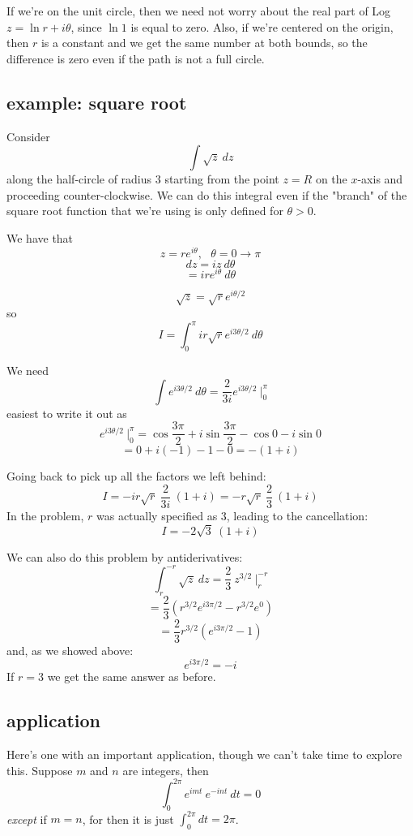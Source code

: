 \documentclass[11pt, oneside]{article}
\begin{document}
If we're on the unit circle, then we need not worry about the real part of Log $z = \ln r + i \theta$, since $\ln 1$ is equal to zero.  Also, if we're centered on the origin, then $r$ is a constant and we get the same number at both bounds, so the difference is zero even if the path is not a full circle.

\subsection*{example: square root}
Consider
\[ \int \sqrt{z} \ dz \]
along the half-circle of radius $3$ starting from the point $z = R$ on the $x$-axis and proceeding counter-clockwise.
We can do this integral even if the "branch" of the square root function that we're using is only defined for $\theta > 0$.  

We have that 
\[ z = re^{i\theta}, \ \ \ \theta = 0 \rightarrow \pi \]
\[ dz = iz \ d \theta \]
\[ = ire^{i\theta} \ d \theta \]

\[ \sqrt{z} = \sqrt{r} e^{i\theta/2} \]
so
\[ I = \int_0^{\pi} ir \sqrt{r} e^{i3\theta/2} \ d \theta \]

We need
\[ \int e^{i3\theta/2} \ d \theta = \frac{2}{3i} e^{i3\theta/2} \ \bigg |_0^{\pi} \]
easiest to write it out as
\[ e^{i3\theta/2} \ \bigg |_0^{\pi} = \cos \frac{3\pi}{2} + i \sin  \frac{3\pi}{2} - \cos 0 - i \sin 0 \]
\[ = 0 + i(-1) - 1 - 0 = -(1+i) \]

Going back to pick up all the factors we left behind:
\[ I = -ir \sqrt{r} \ \frac{2}{3i} \ (1+i) = -r \sqrt{r} \ \frac{2}{3} \ (1+i) \]
In the problem, $r$ was actually specified as $3$, leading to the cancellation:
\[ I = - 2 \sqrt{3} \ (1+i) \]

We can also do this problem by antiderivatives:
\[ \int_r^{-r} \sqrt{z} \ dz = \frac{2}{3} \ z^{3/2} \ \bigg |_r^{-r}  \]
\[ = \frac{2}{3} ( r^{3/2} e^{i3\pi/2} - r^{3/2} e^0) \]
\[ = \frac{2}{3} r^{3/2} ( e^{i3\pi/2} - 1) \]
and, as we showed above:
\[ e^{i3\pi/2} = -i \]
If $r=3$ we get the same answer as before.

\subsection*{application}
Here's one with an important application, though we can't take time to explore this.  Suppose $m$ and $n$ are integers, then
\[ \int_0^{2 \pi} e^{imt} \ e^{-int} \ dt = 0 \]
\emph{except} if $m = n$, for then it is just $\int_0^{2 \pi} dt = 2 \pi$.
\end{document}
